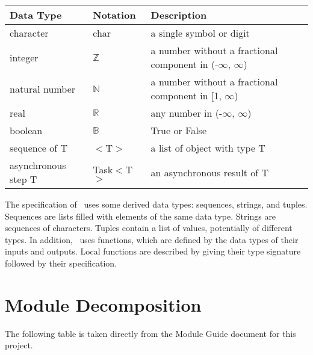 \documentclass[12pt, titlepage]{article}
\begin{document}
\begin{center}
\renewcommand{\arraystretch}{1.2}
\noindent 
\begin{tabular}{l l p{7.5cm}} 
\toprule 
\textbf{Data Type} & \textbf{Notation} & \textbf{Description}\\ 
\midrule
character & char & a single symbol or digit\\
integer & $\mathbb{Z}$ & a number without a fractional component in (-$\infty$, $\infty$) \\
natural number & $\mathbb{N}$ & a number without a fractional component in [1, $\infty$) \\
real & $\mathbb{R}$ & any number in (-$\infty$, $\infty$)\\
boolean & $\mathbb{B}$ & True or False\\
sequence of T & $<$T$>$ & a list of object with type T\\
asynchronous step T & Task$<$T$>$ & an asynchronous result of T\\
\bottomrule
\end{tabular} 
\end{center}

\noindent
The specification of \progname \ uses some derived data types: sequences, strings, and
tuples. Sequences are lists filled with elements of the same data type. Strings
are sequences of characters. Tuples contain a list of values, potentially of
different types. In addition, \progname \ uses functions, which
are defined by the data types of their inputs and outputs. Local functions are
described by giving their type signature followed by their specification.

\section{Module Decomposition}

The following table is taken directly from the Module Guide document for this project.
\end{document}
